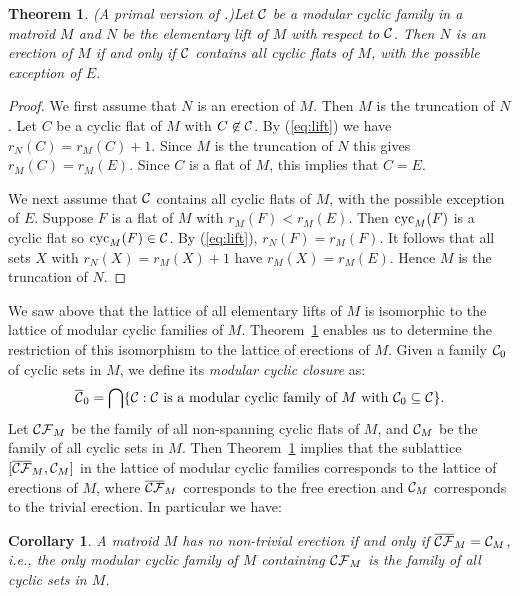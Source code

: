 \documentclass{daj}
\newtheorem{theorem}[thm]{Theorem}\theoremstyle{plain}
\newtheorem{corollary}[thm]{Corollary}\theoremstyle{plain}
\begin{document}
\begin{theorem} {\rm (A primal version of \cite[Lemma 3.1]{D87}.)}\label{thm:erection}
Let ${\cal C}$ be a modular cyclic family in a matroid $M$ and
$N$ be the elementary lift of $M$ with respect to ${\cal C}$.
Then $N$ is an erection of $M$ if and only if ${\cal C}$ contains all cyclic flats of $M$, with the possible exception of $E$.
\end{theorem}
\begin{proof}
We first assume that $N$ is an erection of $M$. Then $M$ is the truncation of $N$. Let $C$ be a  cyclic flat of $M$ with $C\not\in \cal C$.  By (\ref{eq:lift}) we have $r_N(C)=r_M(C)+1$. Since $M$ is the truncation of $N$ this gives $r_M(C)=r_M(E)$. Since $C$ is a flat of $M$, this implies that $C=E$.

We next assume that ${\cal C}$ contains all cyclic flats of $M$, with the possible exception of $E$. Suppose
$F$ is a flat of $M$  with $r_M(F)<r_M(E)$.  Then ${\rm cyc}_M(F)$ is a cyclic flat so ${\rm cyc}_M(F)\in {\cal C}$.
By (\ref{eq:lift}), $r_N(F)=r_M(F)$. It follows that all sets $X$ with $r_N(X)=r_M(X)+1$  have $r_M(X)=r_M(E)$. Hence $M$ is the truncation of $N$.
\end{proof}
We saw above that the lattice of all elementary lifts of $M$ is isomorphic to the lattice of modular cyclic families of $M$. Theorem~\ref{thm:erection} enables us to determine the restriction of this isomorphism to the lattice of erections of $M$. Given a family ${\cal C}_0$ of cyclic sets in $M$, we  define its {\em modular cyclic closure} as:
\[
\overline{{\cal C}}_0=
\bigcap\{ {\cal C}: {\cal C} \text{ is a modular cyclic family of $M$ with } {\cal C}_0\subseteq {\cal C}\}.
\]
Let ${\cal CF}_M$ be the family of all non-spanning cyclic flats of $M$,
and ${\cal C}_M$ be the family of all cyclic sets in $M$.
Then Theorem~\ref{thm:erection} implies that the sublattice $[\overline{{\cal CF}}_M, {\cal C}_M]$ in the lattice of modular cyclic families corresponds to the lattice of erections of $M$, where $\overline{{\cal CF}}_M$ corresponds to the free erection and ${\cal C}_M$ corresponds to the trivial erection. In particular we have:
\begin{corollary}
A matroid $M$ has  no non-trivial erection if and only if $\overline{{\cal CF}}_M={\cal C}_M$, i.e.,
the only modular cyclic family of $M$ containing ${\cal CF}_M$ is the family of all cyclic sets in $M$.
\end{corollary}
\end{document}
